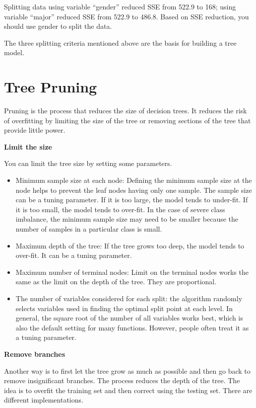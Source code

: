\documentclass[12pt,]{krantz}
\begin{document}
Splitting data using variable ``gender'' reduced SSE from 522.9 to 168; using variable ``major'' reduced SSE from 522.9 to 486.8. Based on SSE reduction, you should use gender to split the data.

The three splitting criteria mentioned above are the basis for building a tree model.

\hypertarget{tree-pruning}{%
\section{Tree Pruning}\label{tree-pruning}}

Pruning is the process that reduces the size of decision trees. It reduces the risk of overfitting by limiting the size of the tree or removing sections of the tree that provide little power.

\textbf{Limit the size}

You can limit the tree size by setting some parameters.

\begin{itemize}
\item
  Minimum sample size at each node: Defining the minimum sample size at the node helps to prevent the leaf nodes having only one sample. The sample size can be a tuning parameter. If it is too large, the model tends to under-fit. If it is too small, the model tends to over-fit. In the case of severe class imbalance, the minimum sample size may need to be smaller because the number of samples in a particular class is small.
\item
  Maximum depth of the tree: If the tree grows too deep, the model tends to over-fit. It can be a tuning parameter.
\item
  Maximum number of terminal nodes: Limit on the terminal nodes works the same as the limit on the depth of the tree. They are proportional.
\item
  The number of variables considered for each split: the algorithm randomly selects variables used in finding the optimal split point at each level. In general, the square root of the number of all variables works best, which is also the default setting for many functions. However, people often treat it as a tuning parameter.
\end{itemize}

\textbf{Remove branches}

Another way is to first let the tree grow as much as possible and then go back to remove insignificant branches. The process reduces the depth of the tree. The idea is to overfit the training set and then correct using the testing set. There are different implementations.
\end{document}
